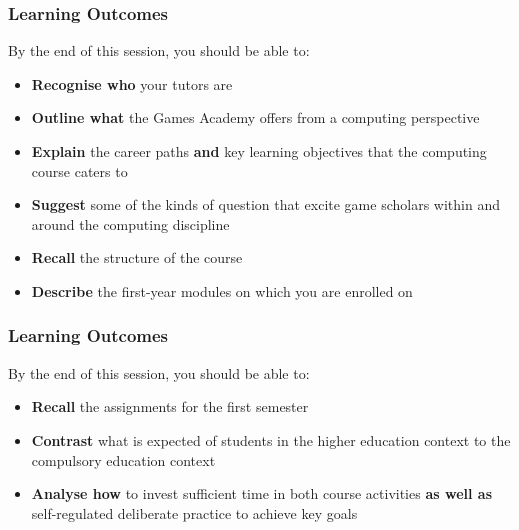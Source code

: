 \usepackage{../../beamerthemeFalmouthGamesAcademy}
\usepackage{multimedia}
\graphicspath{ {../../} }


\usepackage[normalem]{ulem}
\usepackage{wasysym}
\usepackage[T1]{fontenc}
\usepackage{pdfpages}

\usetikzlibrary{arrows,automata}







\title{\sessionnumber}
\subtitle{\modulecode: \moduletitle}

\frame{\titlepage} 

\begin{frame}
	\frametitle{Learning Outcomes}
	
	By the end of this session, you should be able to:
	
	\begin{itemize}
		\item \textbf{Recognise who} your tutors are
		\item \textbf{Outline what} the Games Academy offers from a computing perspective
		\item \textbf{Explain} the career paths \textbf{and} key learning objectives that the computing course caters to
		\item \textbf{Suggest} some of the kinds of question that excite game scholars within and around the computing discipline
		\item \textbf{Recall} the structure of the course
		\item \textbf{Describe} the first-year modules on which you are enrolled on
	\end{itemize}
\end{frame}

\begin{frame}
	\frametitle{Learning Outcomes}
	
	By the end of this session, you should be able to:
	
	\begin{itemize}
		\item \textbf{Recall} the assignments for the first semester
		\item \textbf{Contrast} what is expected of students in the higher education context to the compulsory education context
		\item \textbf{Analyse how} to invest sufficient time in both course activities \textbf{as well as} self-regulated deliberate practice to achieve key goals
	\end{itemize}
\end{frame}

